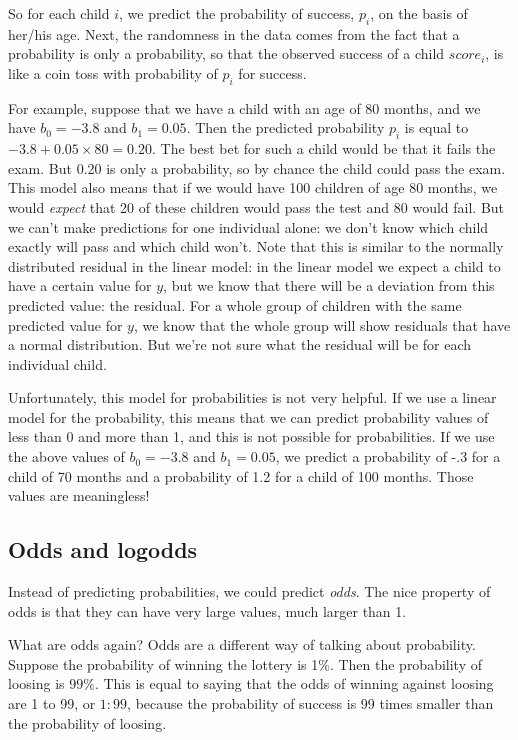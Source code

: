 \documentclass[]{book}\usepackage[]{graphicx}\usepackage[]{color}
\begin{document}
So for each child $i$, we predict the probability of success, $p_i$, on the basis of her/his age. Next, the randomness in the data comes from the fact that a probability is only a probability, so that the observed success of a child $score_i$, is like a coin toss with probability of $p_i$ for success.

For example, suppose that we have a child with an age of 80 months, and we have $b_0=-3.8$ and $b_1=0.05$. Then the predicted probability $p_i$ is equal to $-3.8 + 0.05 \times 80 = 0.20$. The best bet for such a child would be that it fails the exam. But 0.20 is only a probability, so by chance the child could pass the exam. This model also means that if we would have 100 children of age 80 months, we would \textit{expect} that 20 of these children would pass the test and 80 would fail.  But we can't make predictions for one individual alone: we don't know which child exactly will pass and which child won't. Note that this is similar to the normally distributed residual in the linear model: in the linear model we expect a child to have a certain value for $y$, but we know that there will be a deviation from this predicted value: the residual. For a whole group of children with the same predicted value for $y$, we know that the whole group will show residuals that have a normal distribution. But we're not sure what the residual will be for each individual child.

Unfortunately, this model for probabilities is not very helpful. If we use a linear model for the probability, this means that we can predict probability values of less than 0 and more than 1, and this is not possible for probabilities. If we use the above values of $b_0=-3.8$ and $b_1=0.05$, we predict a probability of -.3 for a child of 70 months and a probability of 1.2 for a child of 100 months. Those values are meaningless!



\subsection{Odds and logodds}
Instead of predicting probabilities, we could predict \textit{odds}. The nice property of odds is that they can have very large values, much larger than 1.

What are odds again? Odds are a different way of talking about probability. Suppose the probability of winning the lottery is 1\%. Then the probability of loosing is $99\%$. This is equal to saying that the odds of winning against loosing are 1 to 99, or $1:99$, because the probability of success is 99 times smaller than the probability of loosing.
\end{document}
